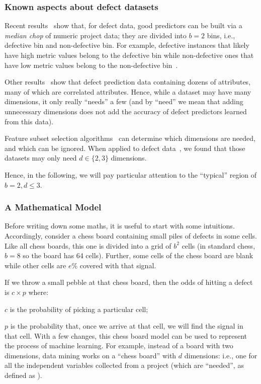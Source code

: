 \subsubsection{Known aspects about defect datasets}\label{sect:data}

Recent
results~\cite{Zhang14,nam2015clami} show that, for defect data, good
predictors can be built via a {\em median chop} of
numeric project data;
they are divided into $b=2$ bins, i.e., defective bin and non-defective bin. For example, defective instances that likely have high metric values belong to the defective bin while non-defective ones that have low metric values belong to the non-defective bin~\cite{nam2015clami}.

Other results~\cite{shepperd94}
show that defect prediction data containing dozens
of attributes, many of which are correlated
attributes. Hence, while a dataset may have many dimensions, it only really ``needs'' a few
(and by ``need'' we mean that adding unnecessary dimensions does not add the accuracy
of defect predictors learned from this data).


Feature subset selection algorithms~\cite{Hall03} can  determine
which  dimensions are needed, and which can be ignored.
When applied to defect data~\cite{Menzies07},
we found that those datasets may only need  $d \in \{2,3\}$
dimensions.

Hence, in the following, we will pay particular attention to the ``typical'' region of
 $b=2, d \le 3$.

\subsubsection{A Mathematical Model}

Before writing down some maths, it is useful to start with some intuitions.
Accordingly, consider a chess board  containing small  piles of defects in some cells.
Like all chess boards, this one is  divided into a grid of $b^2$ cells (in standard chess, $b=8$ so the board has 64 cells).
Further, some cells of the chess board are blank while other cells are $e$\% covered
with that signal.

If we throw a small pebble at that chess board, then  the odds
of hitting a defect is $c \times p$ where:
\squishlist
\item $c$ is the probability of picking a particular cell;
\item $p$ is the probability that, once we arrive at that cell, we will find  the  signal in that cell.
\squishend
With a few changes, this chess board model can be
used to represent the process of machine
learning. For example,
instead of a board with two
dimensions, data mining works on a ``chess board''
with $d$ dimensions: i.e., one for all the independent
variables collected from a project (which are ``needed'', as defined as ).

